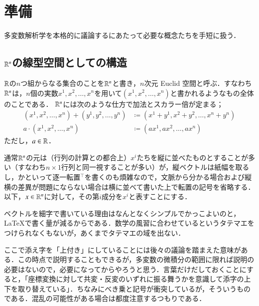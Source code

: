 \section{準備}

多変数解析学を本格的に議論するにあたって必要な概念たちを手短に扱う．

\subsection{$\mathbb{R}^n$の線型空間としての構造}

\begin{defi}
$\mathbb{R}$の$n$つ組からなる集合のことを$\mathbb{R}^n$と書き，$n$次元 Euclid 空間と呼ぶ．すなわち$\mathbb{R}^n$は，$n$個の実数$x^1, x^2, \dots, x^n$を用いて$(x^1, x^2, \dots, x^n)$と書かれるようなもの全体のことである．
$\mathbb{R}^n$には次のような仕方で加法とスカラー倍が定まる；
\begin{align}
(x^1, x^2, \dots, x^n)+(y^1, y^2, \dots, y^n) &\coloneqq (x^1 + y^1, x^2 + y^2, \dots, x^n + y^n) \\
a \cdot (x^1, x^2, \dots, x^n) &\coloneqq (ax^1, ax^2, \dots, ax^n) 
\end{align}ただし，$a \in \mathbb{R}$．
\end{defi}

通常$\mathbb{R}^n$の元は（行列の計算との都合上）$x^i$たちを縦に並べたものとすることが多い（すなわち$n \times 1$行列と同一視することが多い）が，縦ベクトルは紙幅を取るし，かといって逐一転置${}^\top$を書くのも煩雑なので，文脈から分かる場合および縦横の差異が問題にならない場合は横に並べて書いた上で転置の記号を省略する．以下，$x \in \mathbb{R}^n$に対して，その第$i$成分を$x^i$と表すことにする．

\begin{dig}
ベクトルを細字で書いている理由はなんとなくシンプルでかっこよいのと， \LaTeX で書く量が減るからである．数学の風習に合わせているというタテマエをつけられなくもないが，あくまでタテマエの域を出ない．
\end{dig}

\begin{dig}
ここで添え字を「上付き」にしていることには後々の議論を踏まえた意味がある．この時点で説明することもできるが，多変数の微積分の範囲に限れば説明の必要はないので，必要になってからやろうと思う．言葉だけだしておくことにすると，「座標変換に対して共変・反変のいずれに振る舞うかを意識して添字の上下を取り替えている」．ちなみにべき乗と記号が衝突しているが，そういうものである．混乱の可能性がある場合は都度注意するつもりである．
\end{dig}



